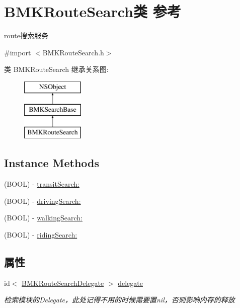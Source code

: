 \hypertarget{interface_b_m_k_route_search}{}\section{B\+M\+K\+Route\+Search类 参考}
\label{interface_b_m_k_route_search}


route搜索服务  




{\ttfamily \#import $<$B\+M\+K\+Route\+Search.\+h$>$}

类 B\+M\+K\+Route\+Search 继承关系图\+:\begin{figure}[H]
\begin{center}
\leavevmode
\includegraphics[height=3.000000cm]{interface_b_m_k_route_search}
\end{center}
\end{figure}
\subsection*{Instance Methods}
\begin{DoxyCompactItemize}
\item 
(B\+O\+O\+L) -\/ \hyperlink{interface_b_m_k_route_search_af5fd9df6e0d4940ca0a2bf7823dc95a8}{transit\+Search\+:}
\item 
(B\+O\+O\+L) -\/ \hyperlink{interface_b_m_k_route_search_a64bca1276cae03de35f61a0f733d6135}{driving\+Search\+:}
\item 
(B\+O\+O\+L) -\/ \hyperlink{interface_b_m_k_route_search_a40676ec66d861873d8e0117feb3e2483}{walking\+Search\+:}
\item 
(B\+O\+O\+L) -\/ \hyperlink{interface_b_m_k_route_search_a1cceee6f350063ac19be436b6fbe100a}{riding\+Search\+:}
\end{DoxyCompactItemize}
\subsection*{属性}
\begin{DoxyCompactItemize}
\item 
\hypertarget{interface_b_m_k_route_search_a5f41c24c0894bb01bb12cacf5c410d95}{}id$<$ \hyperlink{protocol_b_m_k_route_search_delegate-p}{B\+M\+K\+Route\+Search\+Delegate} $>$ \hyperlink{interface_b_m_k_route_search_a5f41c24c0894bb01bb12cacf5c410d95}{delegate}\label{interface_b_m_k_route_search_a5f41c24c0894bb01bb12cacf5c410d95}

\begin{DoxyCompactList}\small\item\em 检索模块的\+Delegate，此处记得不用的时候需要置nil，否则影响内存的释放 \end{DoxyCompactList}\end{DoxyCompactItemize}


